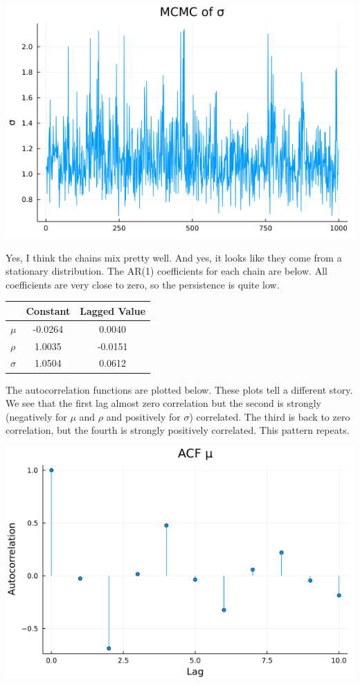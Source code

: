 \documentclass{article}
\begin{document}
\begin{enumerate}
\begin{center}
\includegraphics[scale=0.5]{p2_q3_sigma.png}

\end{center}

Yes, I think the chains mix pretty well. And yes, it looks like they come from a stationary distribution. The AR(1) coefficients for each chain are below.  All coefficients are very close to zero, so the persistence is quite low.

\begin{center}
\begin{tabular}{ l | c c }
& Constant & Lagged Value \\ 
\hline
$\mu$  & -0.0264 & 0.0040 \\  
$\rho$ & 1.0035 & -0.0151  \\
$\sigma$ & 1.0504 & 0.0612
\end{tabular}
\end{center}

\pagebreak

The autocorrelation functions are plotted below.  These plots tell a different story.  We see that the first lag almost zero correlation but the second is strongly (negatively for $\mu$ and $\rho$ and positively for $\sigma$) correlated.  The third is back to zero correlation, but the fourth is strongly positively correlated.  This pattern repeats.

\begin{center}

\includegraphics[scale=0.5]{p2_q3_mu_acf.png}


\end{center}
\end{enumerate}
\end{document}
